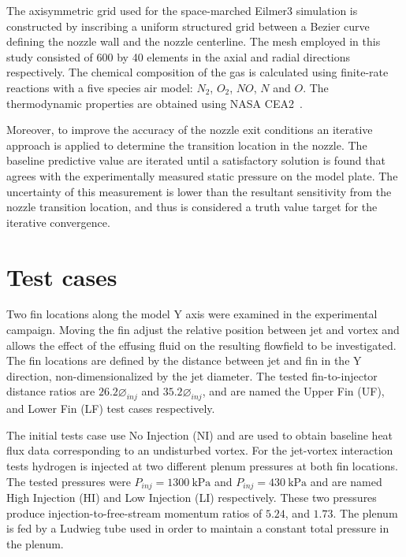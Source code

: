 \documentclass{AIAA}
\begin{document}
The axisymmetric grid used for the space-marched Eilmer3 simulation is constructed by inscribing a uniform structured grid between a Bezier curve defining the nozzle wall and the nozzle centerline.
The mesh employed in this study consisted of 600 by 40 elements in the axial and radial directions respectively.
The chemical composition of the gas is calculated using finite-rate reactions with a five species air model: $N_2$, $O_2$, $NO$, $N$ and $O$.
The thermodynamic properties are obtained using NASA CEA2~\cite{CEA2,Eilmer_TheoryBook}.

Moreover, to improve the accuracy of the nozzle exit conditions an iterative approach is applied to determine the transition location in the nozzle.
The baseline predictive value are iterated until a satisfactory solution is found that agrees with the experimentally measured static pressure on the model plate.
The uncertainty of this measurement is lower than the resultant sensitivity from the nozzle transition location, and thus is considered a truth value target for the iterative convergence\cite{Doherty:PhD_Thesis_Scram_M10}.


\section{Test cases}

Two fin locations along the model Y axis were examined in the experimental campaign.
Moving the fin adjust the relative position between jet and vortex and allows the effect of the effusing fluid on the resulting flowfield to be investigated.
The fin locations are defined by the distance between jet and fin in the Y direction, non-dimensionalized by the jet diameter.
The tested fin-to-injector distance ratios are $26.2\diameter_{inj}$ and $35.2\diameter_{inj}$, and are named the Upper Fin (UF), and Lower Fin (LF) test cases respectively.

The initial tests case use No Injection (NI) and are used to obtain baseline heat flux data corresponding to an undisturbed vortex.
For the jet-vortex interaction tests hydrogen is injected at two different plenum pressures at both fin locations.
The tested pressures were $P_{inj}=\SI{1300}{\kilo\pascal}$ and $P_{inj}=\SI{430}{\kilo\pascal}$ and are named High Injection (HI) and Low Injection (LI) respectively.
These two pressures produce injection-to-free-stream momentum ratios of $5.24$, and $1.73$.
The plenum is fed by a Ludwieg tube used in order to maintain a constant total pressure in the plenum.
\end{document}
